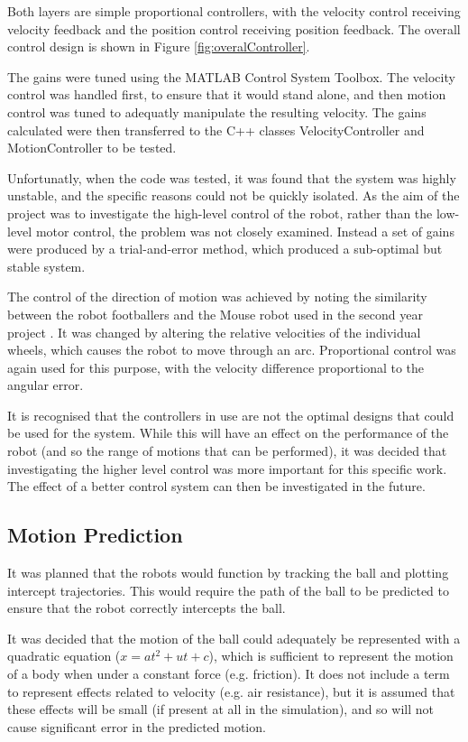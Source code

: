\documentclass[10pt]{article}
\begin{document}
Both layers are simple proportional controllers, with the velocity control
receiving velocity feedback and the position control receiving position
feedback.  The overall control design is shown in Figure
\ref{fig:overalController}.

The gains were tuned using the MATLAB Control System Toolbox. The velocity
control was handled first, to ensure that it would stand alone, and then motion
control was tuned to adequatly manipulate the resulting velocity.  The gains
calculated were then transferred to the C++ classes VelocityController and
MotionController to be tested.

Unfortunatly, when the code was tested, it was found that the system was highly
unstable, and the specific reasons could not be quickly isolated.  As the aim of
the project was to investigate the high-level control of the robot, rather than
the low-level motor control, the problem was not closely examined.  Instead a
set of gains were produced by a trial-and-error method, which produced a
sub-optimal but stable system.

The control of the direction of motion was achieved by noting the similarity
between the robot footballers and the Mouse robot used in the second year
project \cite{mouseProjectReport}.  It was changed by altering the relative
velocities of the individual wheels, which causes the robot to move through an
arc.  Proportional control was again used for this purpose, with the velocity
difference proportional to the angular error.

It is recognised that the controllers in use are not the optimal designs that
could be used for the system.  While this will have an effect on the performance
of the robot (and so the range of motions that can be performed), it was decided
that investigating the higher level control was more important for this specific
work.  The effect of a better control system can then be investigated in the
future.

\subsection{Motion Prediction}
It was planned that the robots would function by tracking the ball and plotting
intercept trajectories.  This would require the path of the ball to be predicted
to ensure that the robot correctly intercepts the ball.

It was decided that the motion of the ball could adequately be represented with
a quadratic equation ($x=at^2+ut+c$), which is sufficient to represent the
motion of a body when under a constant force (e.g. friction).  It does not
include a term to represent effects related to velocity (e.g. air resistance),
but it is assumed that these effects will be small (if present at all in the
simulation), and so will not cause significant error in the predicted motion.
\end{document}

